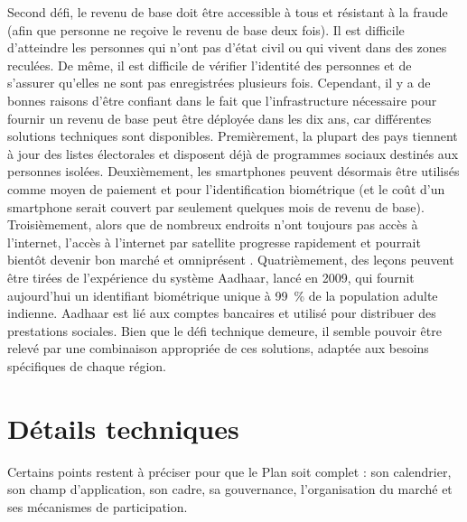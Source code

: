 \documentclass[a5paper,french]{memoir}
\begin{document}
Second défi, le revenu de base doit être accessible à tous et résistant à la fraude (afin que personne ne reçoive le revenu de base deux fois). Il est difficile d'atteindre les personnes qui n'ont pas d'état civil ou qui vivent dans des zones reculées. De même, il est difficile de vérifier l'identité des personnes et de s'assurer qu'elles ne sont pas enregistrées plusieurs fois. Cependant, il y a de bonnes raisons d'être confiant dans le fait que l'infrastructure nécessaire pour fournir un revenu de base peut être déployée dans les dix ans, car différentes solutions techniques sont disponibles. Premièrement, la plupart des pays tiennent à jour des listes électorales et disposent déjà de programmes sociaux destinés aux personnes isolées. Deuxièmement, les smartphones peuvent désormais être utilisés comme moyen de paiement et pour l'identification biométrique (et le coût d'un smartphone serait couvert par seulement quelques mois de revenu de base). Troisièmement, alors que de nombreux endroits n'ont toujours pas accès à l'internet, l'accès à l'internet par satellite progresse rapidement et pourrait bientôt devenir bon marché et omniprésent \citep{hanson_satellite_2016}. Quatrièmement, des leçons peuvent être tirées de l'expérience du système Aadhaar, lancé en 2009, qui fournit aujourd'hui un identifiant biométrique unique à 99~\% de la population adulte indienne. Aadhaar est lié aux comptes bancaires et utilisé pour distribuer des prestations sociales. Bien que le défi technique demeure, il semble pouvoir être relevé par une combinaison appropriée de ces solutions, adaptée aux besoins spécifiques de chaque région. 


\section{Détails techniques}

Certains points restent à préciser pour que le Plan soit complet : son calendrier, son champ d'application, son cadre, sa gouvernance, l'organisation du marché et ses mécanismes de participation. 
\end{document}
